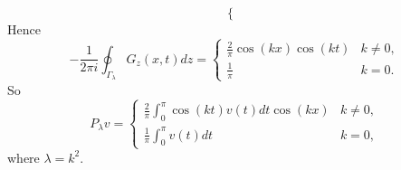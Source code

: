 \begin{example}
\begin{equation*}
\begin{cases}
        \end{cases}
    \end{equation*}
    Hence 
    \begin{equation*}
        -\frac{1}{2\pi i}\oint_{\Gamma_\lambda} G_z(x,t)dz 
        = \begin{cases}
            \frac{2}{\pi}\cos(kx)\cos(kt) & k\neq 0, \\ 
            \frac{1}{\pi} & k = 0.
        \end{cases}
    \end{equation*}
    So 
    \begin{equation*}
        P_\lambda v = \begin{cases}
            \frac{2}{\pi}\int_0^\pi \cos(kt)v(t)dt\cos(kx) & k\neq 0, \\ 
            \frac{1}{\pi}\int_0^\pi v(t)dt & k = 0,
        \end{cases}
    \end{equation*}
    where $\lambda = k^2$. 
\end{example}
